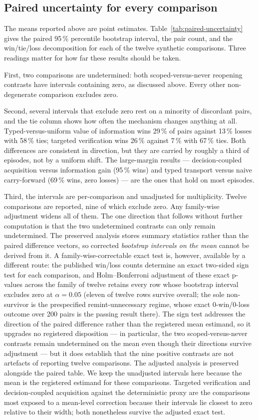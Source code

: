 \subsection{Paired uncertainty for every comparison}
The means reported above are point estimates. Table~\ref{tab:paired-uncertainty} gives the paired 95\,\% percentile bootstrap interval, the pair count, and the win/tie/loss decomposition for each of the twelve synthetic comparisons. Three readings matter for how far these results should be taken.

First, two comparisons are undetermined: both scoped-versus-never reopening contrasts have intervals containing zero, as discussed above. Every other non-degenerate comparison excludes zero.

Second, several intervals that exclude zero rest on a minority of discordant pairs, and the tie column shows how often the mechanism changes anything at all. Typed-versus-uniform value of information wins 29\,\% of pairs against 13\,\% losses with 58\,\% ties; targeted verification wins 26\,\% against 7\,\% with 67\,\% ties. Both differences are consistent in direction, but they are carried by roughly a third of episodes, not by a uniform shift. The large-margin results --- decision-coupled acquisition versus information gain (95\,\% wins) and typed transport versus naive carry-forward (69\,\% wins, zero losses) --- are the ones that hold on most episodes.

Third, the intervals are per-comparison and unadjusted for multiplicity. Twelve comparisons are reported, nine of which exclude zero. Any family-wise adjustment widens all of them. The one direction that follows without further computation is that the two undetermined contrasts can only remain undetermined. The preserved analysis stores summary statistics rather than the paired difference vectors, so corrected \emph{bootstrap intervals on the mean} cannot be derived from it. A family-wise-correctable exact test is, however, available by a different route: the published win/loss counts determine an exact two-sided sign test for each comparison, and Holm--Bonferroni adjustment of these exact p-values across the family of twelve retains every row whose bootstrap interval excludes zero at $\alpha=0.05$ (eleven of twelve rows survive overall; the sole non-survivor is the prespecified remint-unnecessary regime, whose exact 0-win/0-loss outcome over 200 pairs is the passing result there). The sign test addresses the direction of the paired difference rather than the registered mean estimand, so it upgrades no registered disposition --- in particular, the two scoped-versus-never contrasts remain undetermined on the mean even though their directions survive adjustment --- but it does establish that the nine positive contrasts are not artefacts of reporting twelve comparisons. The adjusted analysis is preserved alongside the paired table. We keep the unadjusted intervals here because the mean is the registered estimand for these comparisons. Targeted verification and decision-coupled acquisition against the deterministic proxy are the comparisons most exposed to a mean-level correction because their intervals lie closest to zero relative to their width; both nonetheless survive the adjusted exact test.

